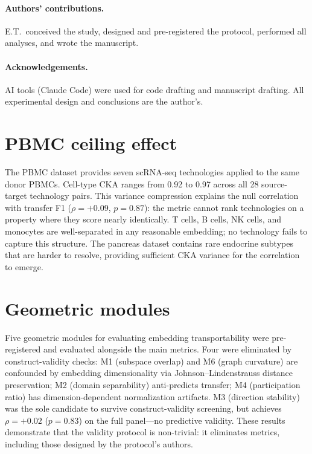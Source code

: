 \documentclass[11pt]{article}
\begin{document}
\paragraph{Authors' contributions.} E.T.\ conceived the study,
designed and pre-registered the protocol, performed all analyses, and
wrote the manuscript.

\paragraph{Acknowledgements.} AI tools (Claude Code) were used for code
drafting and manuscript drafting. All experimental design and conclusions
are the author's.


\appendix

\section{PBMC ceiling effect}
\label{app:pbmc}

The PBMC dataset \citep{ding2020systematic} provides seven scRNA-seq
technologies applied to the same donor PBMCs. Cell-type CKA ranges from
0.92 to 0.97 across all 28 source-target technology pairs. This
variance compression explains the null correlation with transfer F1
($\rho = +0.09$, $p = 0.87$): the metric cannot rank technologies on
a property where they score nearly identically. T cells, B cells, NK
cells, and monocytes are well-separated in any reasonable embedding; no
technology fails to capture this structure. The pancreas dataset contains
rare endocrine subtypes that are harder to resolve, providing sufficient
CKA variance for the correlation to emerge.


\section{Geometric modules}
\label{app:modules}

Five geometric modules for evaluating embedding transportability were
pre-registered and evaluated alongside the main metrics. Four were
eliminated by construct-validity checks: M1 (subspace overlap) and M6
(graph curvature) are confounded by embedding dimensionality via
Johnson--Lindenstrauss distance preservation; M2 (domain separability)
anti-predicts transfer; M4 (participation ratio) has
dimension-dependent normalization artifacts. M3 (direction stability)
was the sole candidate to survive construct-validity screening, but
achieves $\rho = +0.02$ ($p = 0.83$) on the full panel---no
predictive validity. These results demonstrate that the validity
protocol is non-trivial: it eliminates metrics, including those designed
by the protocol's authors.
\end{document}
